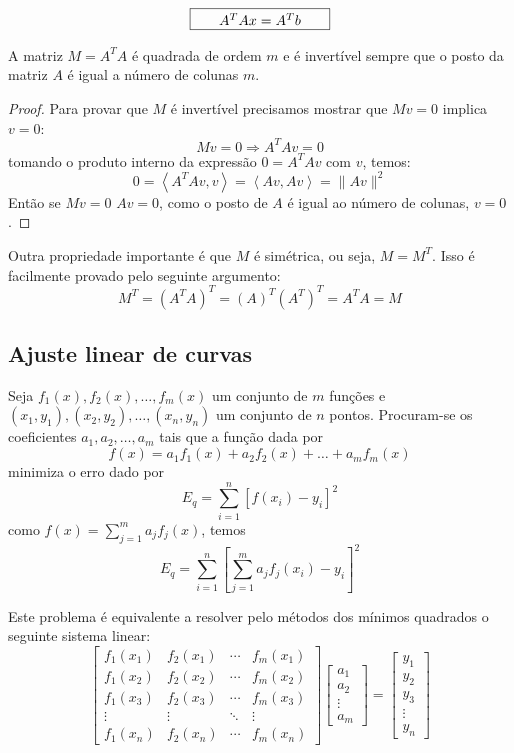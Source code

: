 \begin{equation}\framebox[100 pt][c]{$A^TA x = A^Tb$}\end{equation}

\begin{teo}
A matriz $M=A^TA$ é quadrada de ordem $m$ e é invertível sempre que o posto da matriz $A$ é igual a número de colunas $m$.
\end{teo}
\begin{proof}
Para provar que $M$ é invertível precisamos mostrar que $Mv=0$ implica $v=0$:
$$Mv=0\Longrightarrow A^TAv=0$$
tomando o produto interno da expressão $0=A^TAv$ com $v$, temos:
$$0=\left<A^TAv,v\right>=\left<Av,Av\right>=\|Av\|^2$$
Então se $Mv=0$ $Av=0$, como o posto de $A$ é igual ao número de colunas, $v=0$.
\end{proof}
Outra propriedade importante é que $M$ é simétrica, ou seja, $M=M^T$. Isso é facilmente provado pelo seguinte argumento:
$$M^T=(A^TA)^T=(A)^T(A^T)^T=A^TA=M$$


\subsection{Ajuste linear de curvas}
Seja $f_1(x), f_2(x),\ldots, f_m(x)$ um conjunto de $m$ funções e $(x_1,y_1), (x_2,y_2), \ldots, (x_n,y_n)$ um conjunto de $n$ pontos. Procuram-se os coeficientes $a_1,a_2,\ldots, a_m$ tais que a função dada por
$$f(x)=a_1f_1(x)+a_2f_2(x)+\ldots+a_mf_m(x)$$
minimiza o erro dado por
$$E_q= \sum_{i=1}^n \left[f(x_i)-y_i\right]^2$$
como $f(x)=\sum_{j=1}^m a_jf_j(x)$, temos
$$E_q= \sum_{i=1}^n \left[\sum_{j=1}^m a_jf_j(x_i)-y_i\right]^2$$

Este problema é equivalente a resolver pelo métodos dos mínimos quadrados o seguinte sistema linear:
$$
\left[
\begin{array}{cccc}
f_1(x_1)&f_2(x_1) & \cdots & f_m(x_1)\\
f_1(x_2)&f_2(x_2) & \cdots & f_m(x_2)\\
f_1(x_3)&f_2(x_3) & \cdots & f_m(x_3)\\
\vdots & \vdots & \ddots & \vdots\\
f_1(x_n)&f_2(x_n) & \cdots & f_m(x_n)
\end{array}
\right]
\left[
\begin{array}{c}
a_1\\
a_2\\
\vdots\\
a_m
\end{array}
\right]=\left[\begin{array}{c}
y_1\\
y_2\\
y_3\\
\vdots\\
y_n
\end{array}
\right]
$$



